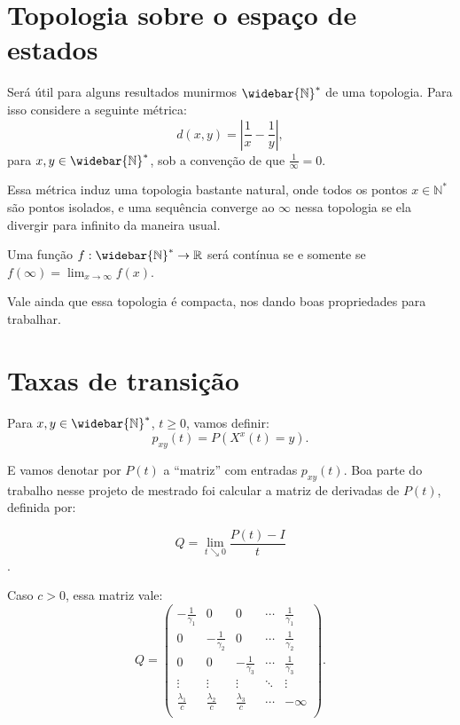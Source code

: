 \documentclass[11pt,twoside,a4paper]{article}
\newcommand{\Nz}{{\mathbb{N^*}}}
\newcommand{\Nzb}{{\mathbb{\widebar{N}^*}}}
\newcommand{\R}{{\mathbb{R}}}
\begin{document}
\section{Topologia sobre o espaço de estados}
\label{sec:topologia}

Será útil para alguns resultados munirmos $\Nzb$ de uma
topologia. Para isso considere a seguinte métrica:
\begin{equation}
  \label{eq:metrica}
  d(x, y) = \left\lvert \frac{1}{x} - \frac{1}{y} \right\rvert,
\end{equation}
para $x, y \in \Nzb$, sob a convenção de que $\frac{1}{\infty} = 0$.

Essa métrica induz uma topologia bastante natural, onde todos os
pontos $x \in \Nz$ são pontos isolados, e uma sequência converge ao
$\infty$ nessa topologia se ela divergir para infinito da maneira
usual.

Uma função $f: \Nzb \to \R$ será contínua se e somente se
$f(\infty) = \lim_{x \to \infty} f(x)$.

Vale ainda que essa topologia é compacta, nos dando boas propriedades
para trabalhar.

\section{Taxas de transição}

Para $x, y \in \Nzb$, $t \geq 0$, vamos definir:
\begin{equation}
  p_{xy} (t) = P(X^x(t) = y).
\end{equation}

E vamos denotar por $P(t)$ a ``matriz'' com entradas $p_{x y}(t)$. Boa
parte do trabalho nesse projeto de mestrado foi calcular a matriz de
derivadas de $P(t)$, definida por:

\begin{displaymath}
  Q = \lim_{t \searrow 0} \frac{P(t) - I}{t} 
\end{displaymath}.

Caso $c > 0$, essa matriz vale:
\begin{displaymath}
  Q = \left(
    \begin{array}{ccccc}
      -\frac{1}{\gamma_1} & 0 & 0 & \cdots & \frac{1}{\gamma_1}\\
      0 & -\frac{1}{\gamma_2} & 0 & \cdots & \frac{1}{\gamma_2}\\
      0 & 0 & -\frac{1}{\gamma_3} & \cdots & \frac{1}{\gamma_3}\\
      \vdots & \vdots & \vdots & \ddots & \vdots \\
      \frac{\lambda_1}{c} & \frac{\lambda_2}{c} &
      \frac{\lambda_3}{c} & \cdots & -\infty\\
    \end{array}
  \right).
\end{displaymath}
\end{document}
